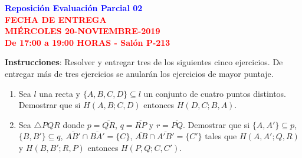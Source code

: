 \documentclass[12pt]{report}
\numberwithin{section}{chapter}
\begin{document}
\begin{center}
\textcolor{blue}{\textbf{\large Reposición Evaluación Parcial 02}}\\
\vspace{0.5 cm}
\textcolor{red}{\textbf{\large FECHA DE ENTREGA \\ MIÉRCOLES 20-NOVIEMBRE-2019\\ De 17:00 a 19:00 HORAS - Salón P-213}}
\end{center}

\textbf{Instrucciones}: Resolver y entregar tres de los siguientes cinco ejercicios. De entregar más de tres ejercicios se anularán los ejercicios de mayor puntaje.


\begin{enumerate}
\item Sea $l$ una recta y $\{A,B,C,D\} \subseteq l$ un conjunto de cuatro puntos distintos. Demostrar que si $H(A,B;C,D)$ entonces $H(D,C; B,A)$.


\item Sea $\triangle PQR$ donde $p = \overline{QR}$, $q=\overline{RP}$ y $r=\overline{PQ}$. Demostrar que si $\{A,A'\}\subseteq p$, $\{B, B'\}\subseteq q$, $\overline{AB'}\cap\overline{BA'}=\{C\}$, $\overline{AB}\cap\overline{A'B'}=\{C'\}$ tales que $H(A,A';Q,R)$ y $H(B,B';R,P)$ entonces $H(P,Q;C,C')$.





\end{enumerate}
\end{document}
